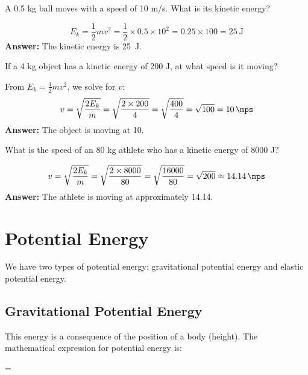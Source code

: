 \begin{exercise}
    A 0.5 kg ball moves with a speed of 10 m/s. What is its kinetic energy?
    \begin{solu}
        \[
            E_k = \frac{1}{2}mv^2 = \frac{1}{2} \times 0.5 \times 10^2 = 0.25 \times 100 = \qty{25}{\joule}
        \]
        \textbf{Answer:} The kinetic energy is \qty{25}{\joule}.
    \end{solu}
\end{exercise}

\begin{exercise}
    If a 4 kg object has a kinetic energy of 200 J, at what speed is it moving?
    \begin{solu}
        From $E_k = \frac{1}{2}mv^2$, we solve for $v$:
        \[
            v = \sqrt{\frac{2E_k}{m}} = \sqrt{\frac{2 \times 200}{4}} = \sqrt{\frac{400}{4}} = \sqrt{100} = \qty{10}{\mps}
        \]
        \textbf{Answer:} The object is moving at \qty{10}{\mps}.
    \end{solu}
\end{exercise}

\begin{exercise}
    What is the speed of an 80 kg athlete who has a kinetic energy of 8000 J?
    \begin{solu}
        \[
            v = \sqrt{\frac{2E_k}{m}} = \sqrt{\frac{2 \times 8000}{80}} = \sqrt{\frac{16000}{80}} = \sqrt{200} \approx \qty{14.14}{\mps}
        \]
        \textbf{Answer:} The athlete is moving at approximately \qty{14.14}{\mps}.
    \end{solu}
\end{exercise}


\section{Potential Energy}

We have two types of potential energy: gravitational potential energy and elastic potential energy.

\subsection{Gravitational Potential Energy}

This energy is a consequence of the position of a body (height).
The mathematical expression for potential energy is:

\vspace{6pt}
\begin{centeredequation}
    =
    \cdot
    \cdot
    \label{eq:energia_potencial}
\end{centeredequation}
\vspace{12pt}


